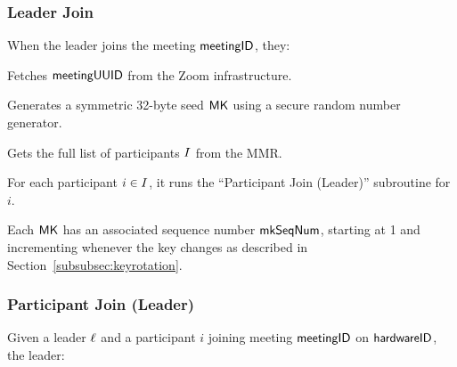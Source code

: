 \subsubsection{Leader Join}\label{subsubsec:leaderjoin}

When the leader joins the meeting ${\sf meetingID}$, they:

\begingroup
\RaggedRight
\begin{enumerate*}
\item Fetches ${\sf meetingUUID}$ from the Zoom infrastructure.
\item Generates a symmetric 32-byte seed ${\sf MK}$ using a secure random number generator.
\item Gets the full list of participants $I$ from the MMR.
\item For each participant $i \in I$, it runs the ``Participant Join (Leader)''
subroutine for $i$.
\end{enumerate*}
\endgroup

Each ${\sf MK}$ has an associated sequence number $\mathsf{mkSeqNum}$, starting at 1 and incrementing
whenever the key changes as described in Section~\ref{subsubsec:keyrotation}.

\subsubsection{Participant Join (Leader)}
\label{subsubsec:participantjoinleader}

Given a leader $\ell$ and a participant $i$ joining meeting ${\sf meetingID}$ on ${\sf hardwareID}$, the
leader:

